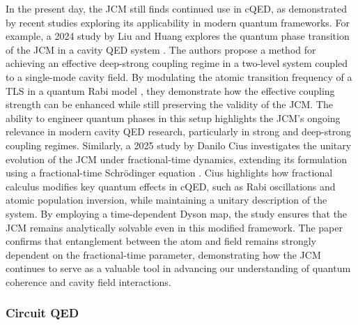 \documentclass[12pt,a4paper]{article}
\begin{document}
In the present day, the JCM still finds continued use in cQED, as demonstrated by recent studies exploring its applicability in modern quantum frameworks. For example, a 2024 study by Liu and Huang explores the quantum phase transition of the JCM in a cavity QED system \cite{Context2024-CQED_JCM}. The authors propose a method for achieving an effective deep-strong coupling regime in a two-level system coupled to a single-mode cavity field. By modulating the atomic transition frequency of a TLS in a quantum Rabi model \cite{Context1936-Rabi}, they demonstrate how the effective coupling strength can be enhanced while still preserving the validity of the JCM. The ability to engineer quantum phases in this setup highlights the JCM’s ongoing relevance in modern cavity QED research, particularly in strong and deep-strong coupling regimes. Similarly, a 2025 study by Danilo Cius investigates the unitary evolution of the JCM under fractional-time dynamics, extending its formulation using a fractional-time Schrödinger equation \cite{Context2025-CQED_JCM}. Cius highlights how fractional calculus modifies key quantum effects in cQED, such as Rabi oscillations and atomic population inversion, while maintaining a unitary description of the system. By employing a time-dependent Dyson map, the study ensures that the JCM remains analytically solvable even in this modified framework. The paper confirms that entanglement between the atom and field remains strongly dependent on the fractional-time parameter, demonstrating how the JCM continues to serve as a valuable tool in advancing our understanding of quantum coherence and cavity field interactions.

\subsubsection{Circuit QED}


\end{document}

